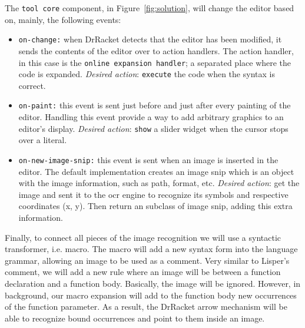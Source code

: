 The \texttt{tool core} component, in Figure~\ref{fig:solution}, will change the editor based on, mainly, the following events:

\begin{itemize}
	\item \texttt{on-change:} when DrRacket detects that the editor has been modified, it sends the contents of the editor over to action handlers.
	The action handler, in this case is the \texttt{online expansion handler}; a separated place where the code is expanded. \textit{Desired action}: \texttt{execute} the code when the syntax is correct. 

	\item \texttt{on-paint:} this event is sent just before and just after every painting of the editor. Handling this event provide a way to add arbitrary graphics to an editor's display. \textit{Desired action}: \texttt{show} a slider widget when the cursor stops over a literal.

	\item \texttt{on-new-image-snip:} this event is sent when an image is inserted in the editor. The default implementation creates an image snip which is an object with the image information, such as path, format, etc. \textit{Desired action}: get the image and sent it to the \ac{ocr} engine to recognize its symbols and respective coordinates (x, y). Then return an subclass of image snip, adding this extra information.
\end{itemize}

Finally, to connect all pieces of the image recognition we will use a syntactic transformer, i.e. macro. The macro will add a new syntax form into the language grammar, allowing an image to be used as a comment. Very similar to Lisper's comment, we will add a new rule where an image will be between a function declaration and a function body. Basically, the image will be ignored. However, in background, our macro expansion will add to the function body new occurrences of the function parameter. As a result, the DrRacket arrow mechanism will be able to recognize bound occurrences and point to them inside an image.